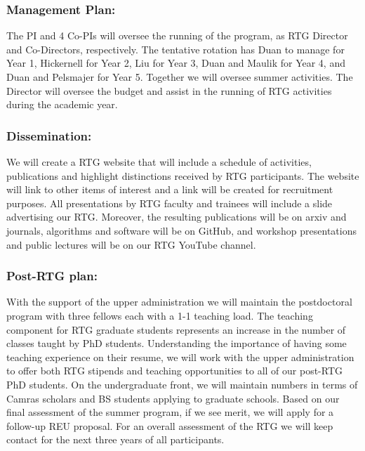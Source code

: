 \documentclass[11pt]{NSFamsart}
\begin{document}
 
\subsubsection*{Management Plan:}
 The PI and 4 Co-PIs will oversee the running of the program, as RTG Director  and Co-Directors, respectively.  The tentative rotation has Duan to manage for Year 1, Hickernell for Year 2,    Liu for  Year 3,    Duan and Maulik for Year 4, and Duan and Pelsmajer for Year 5.   Together we     will oversee summer activities.  
The Director will oversee
the budget and assist in the running of RTG activities during the academic year. 


 \subsubsection*{Dissemination:} 
 We will create a   RTG website that will include a schedule of activities, publications and highlight
distinctions received by RTG participants. The website will link to other items of interest and a link will
be created for recruitment purposes. All presentations by RTG faculty and trainees  will    include a slide advertising our RTG.
Moreover, the resulting publications   will be on arxiv and journals, algorithms and software will be on GitHub, and workshop  presentations and  public lectures will be on our RTG YouTube channel.

 
 \subsubsection*{Post-RTG plan:}
With the support of the upper administration we will maintain the postdoctoral program with three
fellows each with a 1-1 teaching load. The teaching component for RTG graduate students represents
an increase in the number of classes taught by PhD students. Understanding the importance of having
some teaching experience on their resume, we will work with the upper administration to offer both RTG
stipends and teaching opportunities to all of our post-RTG PhD students. On the undergraduate front, we
will maintain numbers in terms of Camras scholars and BS students applying to graduate schools. Based on
our final assessment of the summer program, if we see merit, we will apply for a follow-up REU proposal.
For an overall assessment of the RTG we will keep contact for the next three years of all participants.
\end{document}
